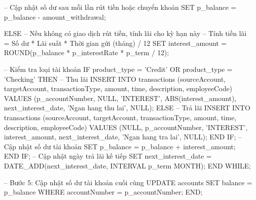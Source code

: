 \begin{itemize}
\begin{MySQLCode}
                -- Cập nhật số dư sau mỗi lần rút tiền hoặc chuyển khoản
                SET p_balance = p_balance - amount_withdrawal;
    \end{MySQLCode}
    \newpage
    \begin{MySQLCode}
            ELSE
                -- Nếu không có giao dịch rút tiền, tính lãi cho kỳ hạn này
                -- Tính tiền lãi = Số dư * Lãi suất * Thời gian gửi (tháng) / 12
                SET interest_amount = ROUND(p_balance * p_interestRate * p_term / 12);

                -- Kiểm tra loại tài khoản
                IF product_type = 'Credit' OR product_type = 'Checking' THEN
                    -- Thu lãi
                    INSERT INTO transactions (sourceAccount, targetAccount, transactionType, amount, time, description, employeeCode)
                    VALUES (p_accountNumber, NULL, 'INTEREST', ABS(interest_amount), next_interest_date, 'Ngan hang thu lai', NULL);
                ELSE
                    -- Trả lãi
                    INSERT INTO transactions (sourceAccount, targetAccount, transactionType, amount, time, description, employeeCode)
                    VALUES (NULL, p_accountNumber, 'INTEREST', interest_amount, next_interest_date, 'Ngan hang tra lai', NULL);
                END IF;
                -- Cập nhật số dư tài khoản
                SET p_balance = p_balance + interest_amount;
            END IF;
            -- Cập nhật ngày trả lãi kế tiếp
            SET next_interest_date = DATE_ADD(next_interest_date, INTERVAL p_term MONTH);
        END WHILE;

        -- Bước 5: Cập nhật số dư tài khoản cuối cùng
        UPDATE accounts
        SET balance = p_balance
        WHERE accountNumber = p_accountNumber;
    END;
    \end{MySQLCode}
    
\end{itemize}